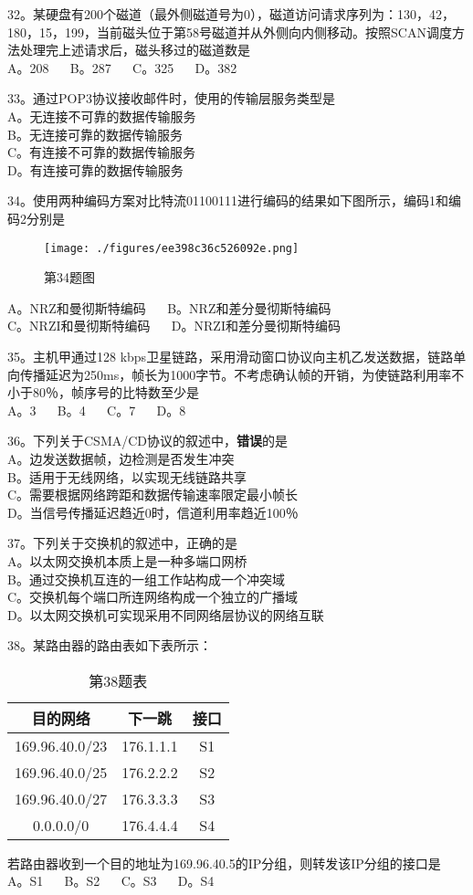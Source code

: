 32。某硬盘有200个磁道（最外侧磁道号为0），磁道访问请求序列为：130，42，180，15，199，当前磁头位于第58号磁道并从外侧向内侧移动。按照SCAN调度方法处理完上述请求后，磁头移过的磁道数是 \\
A。208 $\quad$ B。287 $\quad$ C。325 $\quad$ D。382

33。通过POP3协议接收邮件时，使用的传输层服务类型是 \\
A。无连接不可靠的数据传输服务 \\
B。无连接可靠的数据传输服务 \\
C。有连接不可靠的数据传输服务 \\
D。有连接可靠的数据传输服务

34。使用两种编码方案对比特流01100111进行编码的结果如下图所示，编码1和编码2分别是
\begin{figure}[ht]
\centering
\texttt{[image: ./figures/ee398c36c526092e.png]}
\caption{第34题图} \label{fig_CSN15_2}
\end{figure}
A。NRZ和曼彻斯特编码 $\quad$ B。NRZ和差分曼彻斯特编码 \\
C。NRZI和曼彻斯特编码 $\quad$ D。NRZI和差分曼彻斯特编码

35。主机甲通过128 kbps卫星链路，采用滑动窗口协议向主机乙发送数据，链路单向传播延迟为250ms，帧长为1000字节。不考虑确认帧的开销，为使链路利用率不小于80％，帧序号的比特数至少是 \\
A。3 $\quad$ B。4 $\quad$ C。7 $\quad$ D。8

36。下列关于CSMA/CD协议的叙述中，\textbf{错误}的是 \\
A。边发送数据帧，边检测是否发生冲突 \\
B。适用于无线网络，以实现无线链路共享 \\
C。需要根据网络跨距和数据传输速率限定最小帧长 \\
D。当信号传播延迟趋近0时，信道利用率趋近100％

37。下列关于交换机的叙述中，正确的是 \\
A。以太网交换机本质上是一种多端口网桥 \\
B。通过交换机互连的一组工作站构成一个冲突域 \\
C。交换机每个端口所连网络构成一个独立的广播域 \\
D。以太网交换机可实现采用不同网络层协议的网络互联

38。某路由器的路由表如下表所示：
\begin{table}[ht]
\centering
\caption{第38题表}\label{tab_CSN15_1}
\begin{tabular}{|c|c|c|}
\hline
目的网络 & 下一跳 & 接口 \\
\hline
169.96.40.0/23 & 176.1.1.1 & S1 \\
\hline
169.96.40.0/25 & 176.2.2.2 & S2 \\
\hline
169.96.40.0/27 & 176.3.3.3 & S3 \\
\hline
0.0.0.0/0 & 176.4.4.4 & S4 \\
\hline
\end{tabular}
\end{table}
若路由器收到一个目的地址为169.96.40.5的IP分组，则转发该IP分组的接口是 \\
A。S1 $\quad$ B。S2 $\quad$ C。S3 $\quad$ D。S4

